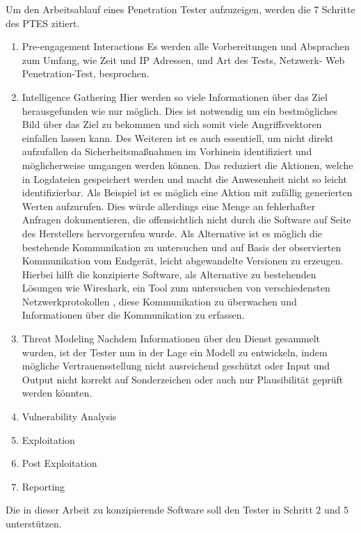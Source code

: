     Um den Arbeitsablauf eines Penetration Tester aufzuzeigen, werden die 7 Schritte des \ac{PTES}
    zitiert.
    \begin{enumerate}
        \item \glqq Pre-engagement Interactions\grqq{}
        Es werden alle Vorbereitungen und Absprachen zum Umfang, wie Zeit und IP Adressen, und Art des Tests, Netzwerk- Web Penetration-Test, besprochen.
        \item \glqq Intelligence Gathering\grqq{}
        Hier werden so viele Informationen über das Ziel herausgefunden wie nur möglich. Dies ist notwendig um ein bestmögliches Bild über das Ziel zu bekommen und sich somit viele Angriffsvektoren einfallen lassen kann. Des Weiteren ist es auch essentiell, um nicht direkt aufzufallen da Sicherheitsmaßnahmen im Vorhinein identifiziert und möglicherweise umgangen werden können. Das reduziert die Aktionen, welche in Logdateien gespeichert werden und macht die Anwesenheit nicht so leicht identifizierbar. Als Beispiel ist es möglich eine Aktion mit zufällig generierten Werten aufzurufen. Dies würde allerdings eine Menge an fehlerhafter Anfragen dokumentieren, die offensichtlich nicht durch die Software auf Seite des Herstellers hervorgerufen wurde. Als Alternative ist es möglich die bestehende Kommunikation zu untersuchen und auf Basis der observierten Kommunikation vom Endgerät, leicht abgewandelte Versionen zu erzeugen. Hierbei hilft die konzipierte Software, als Alternative zu bestehenden Lösungen wie Wireshark, ein Tool zum untersuchen von verschiedensten Netzwerkprotokollen %
        ,  diese Kommunikation zu überwachen und Informationen über die Kommunikation zu erfassen.
        \item \glqq Threat Modeling\grqq{}
        Nachdem Informationen über den Dienst gesammelt wurden, ist der Tester nun in der Lage ein Modell zu entwickeln, indem mögliche Vertrauensstellung nicht ausreichend geschützt oder Input und Output nicht korrekt auf Sonderzeichen oder auch nur Plausibilität geprüft werden könnten. 
        \item \glqq Vulnerability Analysis\grqq{}
        \item \glqq Exploitation\grqq{}
        \item \glqq Post Exploitation\grqq{}
        \item \glqq Reporting\grqq{}
    \end{enumerate}
    Die in dieser Arbeit zu konzipierende Software soll den Tester in Schritt 2 und 5 unterstützen.
    
